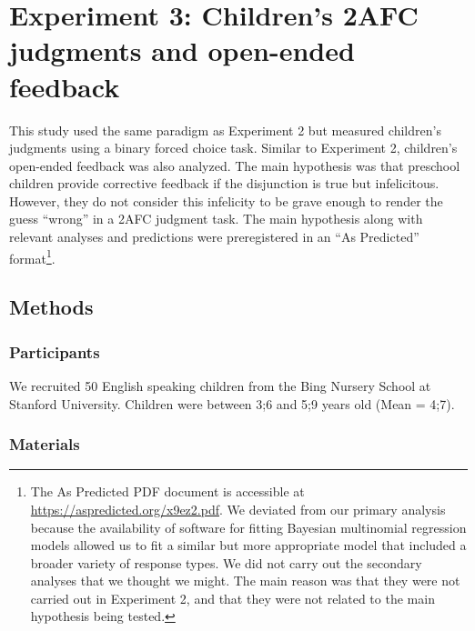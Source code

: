 \documentclass[,man,floatsintext]{apa6}
\let\rmarkdownfootnote\footnote%
\def\footnote{\protect\rmarkdownfootnote}
\begin{document}
\hypertarget{study3}{%
\section{Experiment 3: Children's 2AFC judgments and open-ended feedback}\label{study3}}

This study used the same paradigm as Experiment 2 but measured children's judgments using a binary forced choice task. Similar to Experiment 2, children's open-ended feedback was also analyzed. The main hypothesis was that preschool children provide corrective feedback if the disjunction is true but infelicitous. However, they do not consider this infelicity to be grave enough to render the guess \enquote{wrong} in a 2AFC judgment task. The main hypothesis along with relevant analyses and predictions were preregistered in an \enquote{As Predicted} format\footnote{The As Predicted PDF document is accessible at \url{https://aspredicted.org/x9ez2.pdf}. We deviated from our primary analysis because the availability of software for fitting Bayesian multinomial regression models allowed us to fit a similar but more appropriate model that included a broader variety of response types. We did not carry out the secondary analyses that we thought we might. The main reason was that they were not carried out in Experiment 2, and that they were not related to the main hypothesis being tested.}.

\hypertarget{methods-2}{%
\subsection{Methods}\label{methods-2}}

\hypertarget{participants-2}{%
\subsubsection{Participants}\label{participants-2}}

We recruited 50 English speaking children from the Bing Nursery School at Stanford University. Children were between 3;6 and 5;9 years old (Mean = 4;7).

\hypertarget{materials-1}{%
\subsubsection{Materials}\label{materials-1}}
\end{document}
